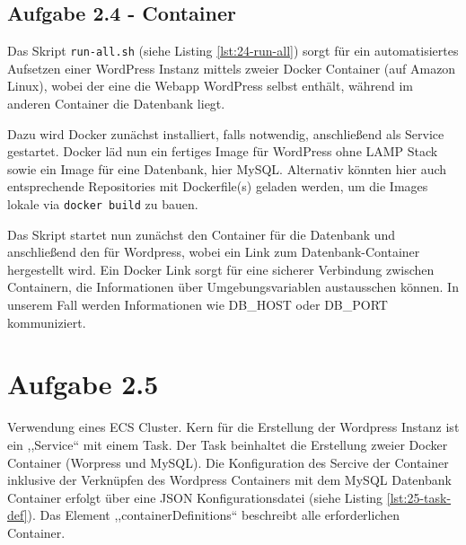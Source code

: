 \documentclass[a4paper]{scrartcl}
\begin{document}

\subsection*{Aufgabe 2.4 - Container}

Das Skript \texttt{run-all.sh} (siehe Listing \ref{lst:24-run-all}) sorgt für ein automatisiertes Aufsetzen einer WordPress Instanz mittels zweier Docker Container (auf Amazon Linux), wobei der eine die Webapp WordPress selbst enthält, während im anderen Container die Datenbank liegt.

Dazu wird Docker zunächst installiert, falls notwendig, anschließend als Service gestartet. Docker läd nun ein fertiges Image für WordPress ohne LAMP Stack sowie ein Image für eine Datenbank, hier MySQL. Alternativ könnten hier auch entsprechende Repositories mit Dockerfile(s) geladen werden, um die Images lokale via \texttt{docker build} zu bauen.

Das Skript startet nun zunächst den Container für die Datenbank und anschließend den für Wordpress, wobei ein Link zum Datenbank-Container hergestellt wird. Ein Docker Link sorgt für eine sicherer Verbindung zwischen Containern, die Informationen über Umgebungsvariablen austausschen können. In unserem Fall werden Informationen wie DB\_HOST oder DB\_PORT kommuniziert.

\section*{Aufgabe 2.5}
Verwendung eines ECS Cluster. Kern f\"ur die Erstellung der Wordpress Instanz ist ein ,,Service`` mit einem Task. Der Task beinhaltet die Erstellung zweier Docker Container (Worpress und MySQL). Die Konfiguration des Sercive der Container inklusive der Verkn\"upfen des Wordpress Containers mit dem MySQL Datenbank Container erfolgt \"uber eine JSON Konfigurationsdatei (siehe Listing \ref{lst:25-task-def}). Das Element ,,containerDefinitions`` beschreibt alle  erforderlichen Container.

\end{document}
